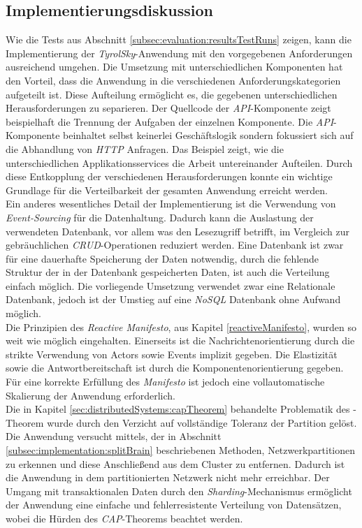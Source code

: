 \subsection{Implementierungsdiskussion}
Wie die Tests aus Abschnitt \ref{subsec:evaluation:resultsTestRuns} zeigen, kann die Implementierung der \textit{TyrolSky}-Anwendung mit den vorgegebenen Anforderungen ausreichend umgehen. Die Umsetzung mit unterschiedlichen Komponenten hat den Vorteil, dass die Anwendung in die verschiedenen Anforderungskategorien aufgeteilt ist. Diese Aufteilung ermöglicht es, die gegebenen unterschiedlichen Herausforderungen zu separieren. Der Quellcode der \textit{API}-Komponente zeigt beispielhaft die Trennung der Aufgaben der einzelnen Komponente. Die \textit{API}-Komponente beinhaltet selbst keinerlei Geschäftslogik sondern fokussiert sich auf die Abhandlung von \textit{HTTP} Anfragen. Das Beispiel zeigt, wie die unterschiedlichen Applikationsservices die Arbeit untereinander Aufteilen. Durch diese Entkopplung der verschiedenen Herausforderungen konnte ein wichtige Grundlage für die Verteilbarkeit der gesamten Anwendung erreicht werden. \\
Ein anderes wesentliches Detail der Implementierung ist die Verwendung von \textit{Event-Sourcing} für die Datenhaltung. Dadurch kann die Auslastung der verwendeten Datenbank, vor allem was den Lesezugriff betrifft, im Vergleich zur gebräuchlichen \textit{CRUD}-Operationen reduziert werden. 
Eine Datenbank ist zwar für eine dauerhafte Speicherung der Daten notwendig, durch die fehlende Struktur der in der Datenbank gespeicherten Daten, ist auch die Verteilung einfach möglich. Die vorliegende Umsetzung verwendet zwar eine Relationale Datenbank, jedoch ist der Umstieg auf eine \textit{NoSQL} Datenbank ohne Aufwand möglich. \\
Die Prinzipien des \textit{Reactive Manifesto}, aus Kapitel \ref{reactiveManifesto}, wurden so weit wie möglich eingehalten. Einerseits ist die Nachrichtenorientierung durch die strikte Verwendung von Actors sowie Events implizit gegeben. Die Elastizität sowie die Antwortbereitschaft ist durch die Komponentenorientierung gegeben. Für eine korrekte Erfüllung des \textit{Manifesto} ist jedoch eine vollautomatische Skalierung der Anwendung erforderlich. \\
Die in Kapitel \ref{sec:distributedSystems:capTheorem} behandelte Problematik des -Theorem wurde durch den Verzicht auf vollständige Toleranz der Partition gelöst. Die Anwendung versucht mittels, der in Abschnitt 
\ref{subsec:implementation:splitBrain} beschriebenen Methoden, Netzwerkpartitionen zu erkennen und diese Anschließend aus dem Cluster zu entfernen. Dadurch ist die Anwendung in dem partitionierten Netzwerk nicht mehr erreichbar. Der Umgang mit transaktionalen Daten durch den \textit{Sharding}-Mechanismus ermöglicht der Anwendung eine einfache und fehlerresistente Verteilung von Datensätzen, wobei die Hürden des \textit{CAP}-Theorems beachtet werden.


